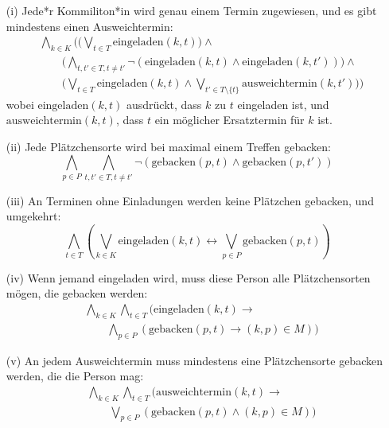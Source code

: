 \documentclass[12pt,a4paper]{article}
\begin{document}
\begin{itemize}
   \item[(i)] Jede*r Kommiliton*in wird genau einem Termin zugewiesen, und es gibt mindestens einen Ausweichtermin:
   \begin{align*}
   &\bigwedge_{k \in K} \Big( 
       \big(\bigvee_{t \in T} \text{eingeladen}(k, t)\big) \land \\
   &\qquad\big(\bigwedge_{t,t' \in T, t \neq t'} \neg(\text{eingeladen}(k,t) \land \text{eingeladen}(k,t'))\big) \land \\
   &\qquad\big(\bigvee_{t \in T} \text{eingeladen}(k, t) \land 
       \bigvee_{t' \in T \setminus \{t\}} \text{ausweichtermin}(k, t')\big)
   \Big)
   \end{align*}
   wobei $\text{eingeladen}(k, t)$ ausdrückt, dass $k$ zu $t$ eingeladen ist, und $\text{ausweichtermin}(k, t)$, dass $t$ ein möglicher Ersatztermin für $k$ ist.

   \item[(ii)] Jede Plätzchensorte wird bei maximal einem Treffen gebacken:
   \[
   \bigwedge_{p \in P} \bigwedge_{t,t' \in T, t \neq t'} \neg(\text{gebacken}(p,t) \land \text{gebacken}(p,t'))
   \]

   \item[(iii)] An Terminen ohne Einladungen werden keine Plätzchen gebacken, und umgekehrt:
   \[
   \bigwedge_{t \in T} \left( \bigvee_{k \in K} \text{eingeladen}(k, t) \leftrightarrow \bigvee_{p \in P} \text{gebacken}(p, t) \right)
   \]

   \item[(iv)] Wenn jemand eingeladen wird, muss diese Person alle Plätzchensorten mögen, die gebacken werden:
   \begin{align*}
   &\bigwedge_{k \in K} \bigwedge_{t \in T} \Big( \text{eingeladen}(k, t) \rightarrow \\
   &\qquad\bigwedge_{p \in P} (\text{gebacken}(p, t) \rightarrow (k, p) \in M) \Big)
   \end{align*}

   \item[(v)] An jedem Ausweichtermin muss mindestens eine Plätzchensorte gebacken werden, die die Person mag:
   \begin{align*}
   &\bigwedge_{k \in K} \bigwedge_{t \in T} \Big( \text{ausweichtermin}(k, t) \rightarrow \\
   &\qquad\bigvee_{p \in P} (\text{gebacken}(p, t) \land (k, p) \in M) \Big)
   \end{align*}
\end{itemize}
\end{document}
